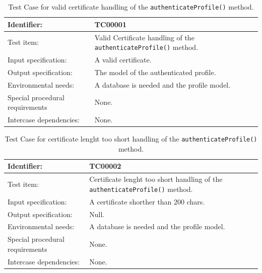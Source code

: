 \begin{table}[htbp]
	\centering
		\begin{tabular}{| p{4.5cm} | m{9cm} |}
			\hline
			Identifier: 					& TC00001 \\ \hline
			Test item:						& Valid Certificate handling of the \texttt{authenticateProfile()} method. \\ \hline
			Input specification:			& A valid certificate. \\ \hline
			Output specification: 			& The model of the authenticated profile. \\ \hline
			Environmental needs:			& A database is needed and the profile model. \\ \hline
			Special procedural requirements	& None. \\ \hline
			Intercase dependencies:			& None. \\ \hline
		\end{tabular}
	\caption{Test Case for valid certificate handling of the \texttt{authenticateProfile()} method.}
	\label{tab:TestCase_ValidCertificateHandling}
\end{table}

\begin{table}[htbp]
	\centering
		\begin{tabular}{| p{4.5cm} | m{9cm} |}
			\hline
			Identifier: 					& TC00002 \\ \hline
			Test item:						& Certificate lenght too short handling of the \texttt{authenticateProfile()} method. \\ \hline
			Input specification:			& A certificate shorther than 200 chars. \\ \hline
			Output specification: 			& Null. \\ \hline
			Environmental needs:			& A database is needed and the profile model. \\ \hline
			Special procedural requirements	& None. \\ \hline
			Intercase dependencies:			& None. \\ \hline
		\end{tabular}
	\caption{Test Case for certificate lenght too short handling of the \texttt{authenticateProfile()} method.}
	\label{tab:TestCase_CertificateToShortHandling}
\end{table}

